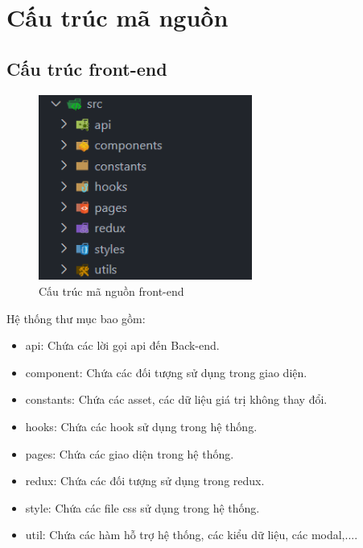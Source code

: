\section{Cấu trúc mã nguồn}
\subsection{Cấu trúc front-end}
\begin{figure}[!htp]
    \begin{center}
        \includegraphics[width=7cm]{img/file-structure/front-end.png}
    \end{center}
    \caption{Cấu trúc mã nguồn front-end}
\end{figure}

Hệ thống thư mục bao gồm:
\begin{itemize}
    \item api: Chứa các lời gọi api đến Back-end.
    \item component: Chứa các đối tượng sử dụng trong giao diện.
    \item constants: Chứa các asset, các dữ liệu giá trị không thay đổi.
    \item hooks: Chứa các hook sử dụng trong hệ thống.
    \item pages: Chứa các giao diện trong hệ thống.
    \item redux: Chứa các đối tượng sử dụng trong redux.
    \item style: Chứa các file css sử dụng trong hệ thống.
    \item util: Chứa các hàm hỗ trợ hệ thống, các kiểu dữ liệu, các modal,....
\end{itemize}


\newpage

